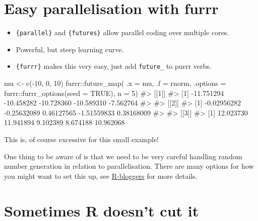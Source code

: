 \documentclass[
  letterpaper,
  DIV=11,
  numbers=noendperiod]{scrreprt}
\newenvironment{Shaded}{\begin{snugshade}}{\end{snugshade}}
\newcommand{\AttributeTok}[1]{\textcolor[rgb]{0.40,0.45,0.13}{#1}}
\newcommand{\CommentTok}[1]{\textcolor[rgb]{0.37,0.37,0.37}{#1}}
\newcommand{\ConstantTok}[1]{\textcolor[rgb]{0.56,0.35,0.01}{#1}}
\newcommand{\DecValTok}[1]{\textcolor[rgb]{0.68,0.00,0.00}{#1}}
\newcommand{\FunctionTok}[1]{\textcolor[rgb]{0.28,0.35,0.67}{#1}}
\newcommand{\NormalTok}[1]{\textcolor[rgb]{0.00,0.23,0.31}{#1}}
\newcommand{\OtherTok}[1]{\textcolor[rgb]{0.00,0.23,0.31}{#1}}
\newcommand{\SpecialCharTok}[1]{\textcolor[rgb]{0.37,0.37,0.37}{#1}}
\begin{document}
\section{Easy parallelisation with
furrr}\label{easy-parallelisation-with-furrr}

\begin{itemize}
\item
  \texttt{\{parallel\}} and \texttt{\{futures\}} allow parallel coding
  over multiple cores.
\item
  Powerful, but steep learning curve.
\item
  \texttt{\{furrr\}} makes this very easy, just add \texttt{future\_} to
  purrr verbs.
\end{itemize}

\begin{Shaded}
\begin{Highlighting}[]
\NormalTok{mu }\OtherTok{\textless{}{-}} \FunctionTok{c}\NormalTok{(}\SpecialCharTok{{-}}\DecValTok{10}\NormalTok{, }\DecValTok{0}\NormalTok{, }\DecValTok{10}\NormalTok{)}
\NormalTok{furrr}\SpecialCharTok{::}\FunctionTok{future\_map}\NormalTok{(}
  \AttributeTok{.x =}\NormalTok{ mu, }
  \AttributeTok{.f =}\NormalTok{ rnorm,}
  \AttributeTok{.options =}\NormalTok{ furrr}\SpecialCharTok{::}\FunctionTok{furrr\_options}\NormalTok{(}\AttributeTok{seed =} \ConstantTok{TRUE}\NormalTok{),}
  \AttributeTok{n =} \DecValTok{5}\NormalTok{) }
\CommentTok{\#\textgreater{} [[1]]}
\CommentTok{\#\textgreater{} [1] {-}11.751294 {-}10.458282 {-}10.728360 {-}10.589310  {-}7.562764}
\CommentTok{\#\textgreater{} }
\CommentTok{\#\textgreater{} [[2]]}
\CommentTok{\#\textgreater{} [1] {-}0.02956282 {-}0.25632089  0.46127565 {-}1.51559833  0.38168009}
\CommentTok{\#\textgreater{} }
\CommentTok{\#\textgreater{} [[3]]}
\CommentTok{\#\textgreater{} [1] 12.023730 11.941894  9.102389  8.674188 10.962068}
\end{Highlighting}
\end{Shaded}

This is, of course excessive for this small example!

One thing to be aware of is that we need to be very careful handling
random number generation in relation to parallelisation. There are many
options for how you might want to set this up, see
\href{https://www.r-bloggers.com/2020/09/future-1-19-1-making-sure-proper-random-numbers-are-produced-in-parallel-processing/}{R-bloggers}
for more details.

\section{Sometimes R doesn't cut it}\label{sometimes-r-doesnt-cut-it}
\end{document}

